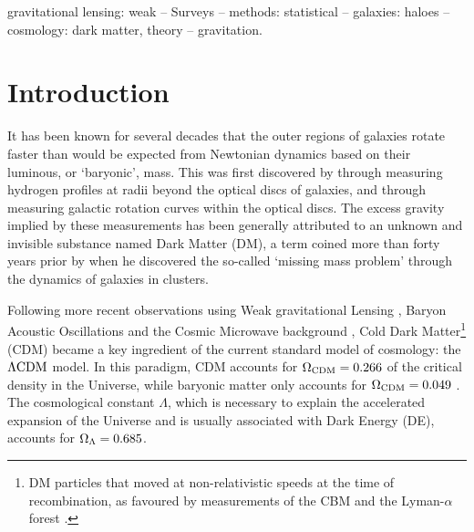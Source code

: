 \documentclass[usenatbib]{mnras}
\newcommand{\lcdm}{{\rm \Lambda CDM}}
\newcommand{\un}[1]{_{\rm #1}}
\begin{document}
\begin{keywords}
gravitational lensing: weak -- Surveys -- methods: statistical -- galaxies: haloes -- cosmology: dark matter, theory -- gravitation.
\\
\end{keywords}

\clearpage




\section{Introduction}
\label{sec:introduction}

It has been known for several decades that the outer regions of galaxies rotate faster than would be expected from Newtonian dynamics based on their luminous, or `baryonic', mass. This was first discovered by \cite{bosma1981} through measuring hydrogen profiles at radii beyond the optical discs of galaxies, and \cite{rubin1983} through measuring galactic rotation curves within the optical discs. The excess gravity implied by these measurements has been generally attributed to an unknown and invisible substance named Dark Matter (DM), a term coined more than forty years prior by \cite{zwicky1937} when he discovered the so-called `missing mass problem' through the dynamics of galaxies in clusters.

Following more recent observations using Weak gravitational Lensing \cite[WL,][]{hoekstra2004,linden2014,mandelbaum2015}, Baryon Acoustic Oscillations \cite[BAO's,][]{eisenstein2005,blake2011} and the Cosmic Microwave background \cite[CMB,][]{spergel2003,planck2014}, Cold Dark Matter\footnote{DM particles that moved at non-relativistic speeds at the time of recombination, as favoured by measurements of the CBM \cite[]{planck2014} and the Lyman-$\alpha$ forest \cite[]{viel2013}.} (CDM) became a key ingredient of the current standard model of cosmology: the $\lcdm$ model. In this paradigm, CDM accounts for $\Omega\un{CDM}=0.266$ of the critical density in the Universe, while baryonic matter only accounts for $\Omega\un{CDM}=0.049$ \cite[]{planck2018}. The cosmological constant $\Lambda$, which is necessary to explain the accelerated expansion of the Universe and is usually associated with Dark Energy (DE), accounts for $\Omega\un{\Lambda}=0.685$.
\end{document}
